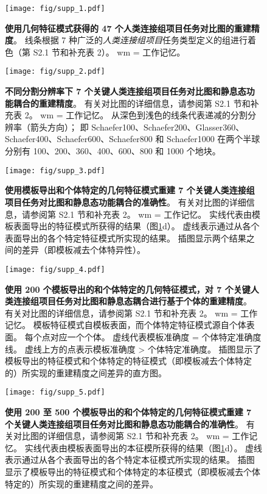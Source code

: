 \documentclass[lang=cn,a4paper,newtx]{elegantpaper}
\begin{document}
\begin{figure}[!htb] 
	\centering
	\texttt{[image: fig/supp\_1.pdf]}
	\caption{\textbf{使用几何特征模式获得的 47 个人类连接组项目任务对比图的重建精度}。
		线条根据 7 种广泛的\textit{人类连接组项目}任务类型定义的组进行着色（第 S2.1 节和补充表 2）。 wm = 工作记忆。} \label{fig:supp_1}
\end{figure}



\begin{figure}[!htb] 
	\centering
	\texttt{[image: fig/supp\_2.pdf]}
	\caption{\textbf{不同分割分辨率下 7 个关键人类连接组项目任务对比图和静息态功能耦合的重建精度}。 
		有关对比图的详细信息，请参阅第 S2.1 节和补充表 2。
		wm = 工作记忆。
		从深色到浅色的线条代表递减的分割分辨率（箭头方向）；
		即 Schaefer100、Schaefer200、Glasser360、Schaefer400、Schaefer600、Schaefer800 和 Schaefer1000 在两个半球分别有 100、200、360、400、600、800 和 1000 个地块。} \label{fig:supp_2}
\end{figure}



\begin{figure}[!htb] 
	\centering
	\texttt{[image: fig/supp\_3.pdf]}
	\caption{\textbf{使用模板导出和个体特定的几何特征模式重建 7 个关键人类连接组项目任务对比图和静息态功能耦合的准确性}。
		有关对比图的详细信息，请参阅第 S2.1 节和补充表 2。 
		wm = 工作记忆。
		实线代表由模板表面导出的特征模式所获得的结果（图\ref{fig:supp_1}d）。
		虚线表示通过从各个表面导出的各个特定特征模式所实现的结果。
		插图显示两个结果之间的差异（即模板减去个体特异性）。} \label{fig:supp_3}
\end{figure}




\begin{figure}[!htb] 
	\centering
	\texttt{[image: fig/supp\_4.pdf]}
	\caption{\textbf{使用 200 个模板导出的和个体特定的几何特征模式，对 7 个关键人类连接组项目任务对比图和静息态耦合进行基于个体的重建精度}。
		有关对比图的详细信息，请参阅第 S2.1 节和补充表 2。
		wm = 工作记忆。
		模板特征模式自模板表面，而个体特定特征模式源自个体表面。
		每个点对应一个个体。
		虚线代表模板准确度 = 个体特定准确度线。
		虚线上方的点表示模板准确度 > 个体特定准确度。
		插图显示了模板导出的特征模式和个体特定的特征模式（即模板减去个体特定的）所实现的重建精度之间差异的直方图。} \label{fig:supp_4}
\end{figure}


\begin{figure}[!htb] 
	\centering
	\texttt{[image: fig/supp\_5.pdf]}
	\caption{\textbf{使用 200 至 500 个模板导出的和个体特定的几何特征模式重建 7 个关键人类连接组项目任务对比图和静息态功能耦合的准确性}。
		有关对比图的详细信息，请参阅第 S2.1 节和补充表 2。
		wm = 工作记忆。
		实线代表由模板表面导出的本征模所获得的结果（图\ref{fig:supp_1}d）。
		虚线表示通过从各个表面导出的各个特定本征模式所实现的结果。
		插图显示了模板导出的特征模式和个体特定的本征模式（即模板减去个体特定的）所实现的重建精度之间的差异。} \label{fig:supp_5}
\end{figure}
\end{document}

